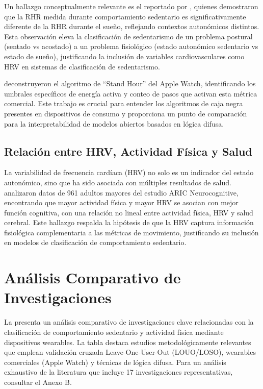 Un hallazgo conceptualmente relevante es el reportado por \cite{Godkin2025Context}, quienes demostraron que la RHR medida durante comportamiento sedentario es significativamente diferente de la RHR durante el sueño, reflejando contextos autonómicos distintos. Esta observación eleva la clasificación de sedentarismo de un problema postural (sentado vs acostado) a un problema fisiológico (estado autonómico sedentario vs estado de sueño), justificando la inclusión de variables cardiovasculares como HRV en sistemas de clasificación de sedentarismo.

\cite{Lyons2024StandHour} deconstruyeron el algoritmo de ``Stand Hour'' del Apple Watch, identificando los umbrales específicos de energía activa y conteo de pasos que activan esta métrica comercial. Este trabajo es crucial para entender los algoritmos de caja negra presentes en dispositivos de consumo y proporciona un punto de comparación para la interpretabilidad de modelos abiertos basados en lógica difusa.

\subsection{Relación entre HRV, Actividad Física y Salud}
\label{subsec:hrv_cognicion}

La variabilidad de frecuencia cardíaca (HRV) no solo es un indicador del estado autonómico, sino que ha sido asociada con múltiples resultados de salud. \cite{Marino2024ARIC} analizaron datos de 961 adultos mayores del estudio ARIC Neurocognitive, encontrando que mayor actividad física y mayor HRV se asocian con mejor función cognitiva, con una relación no lineal entre actividad física, HRV y salud cerebral. Este hallazgo respalda la hipótesis de que la HRV captura información fisiológica complementaria a las métricas de movimiento, justificando su inclusión en modelos de clasificación de comportamiento sedentario.

\section{Análisis Comparativo de Investigaciones}
\label{sec:cuadro_comparativo}


La  presenta un análisis comparativo de investigaciones clave relacionadas con la clasificación de comportamiento sedentario y actividad física mediante dispositivos wearables. La tabla destaca estudios metodológicamente relevantes que emplean validación cruzada Leave-One-User-Out (LOUO/LOSO), wearables comerciales (Apple Watch) y técnicas de lógica difusa. Para un análisis exhaustivo de la literatura que incluye 17 investigaciones representativas, consultar el Anexo B.

